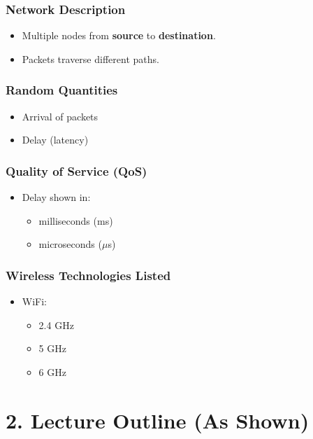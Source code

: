 \documentclass[12pt]{article}
\begin{document}
\subsubsection*{Network Description}

\begin{itemize}
  \item Multiple nodes from \textbf{source} to \textbf{destination}.
  \item Packets traverse different paths.
\end{itemize}

\subsubsection*{Random Quantities}

\begin{itemize}
  \item Arrival of packets
  \item Delay (latency)
\end{itemize}

\subsubsection*{Quality of Service (QoS)}

\begin{itemize}
  \item Delay shown in:
  \begin{itemize}
    \item milliseconds (ms)
    \item microseconds ($\mu$s)
  \end{itemize}
\end{itemize}

\subsubsection*{Wireless Technologies Listed}

\begin{itemize}
  \item WiFi:
  \begin{itemize}
    \item 2.4 GHz
    \item 5 GHz
    \item 6 GHz
  \end{itemize}
\end{itemize}

\section*{2. Lecture Outline (As Shown)}
\end{document}

